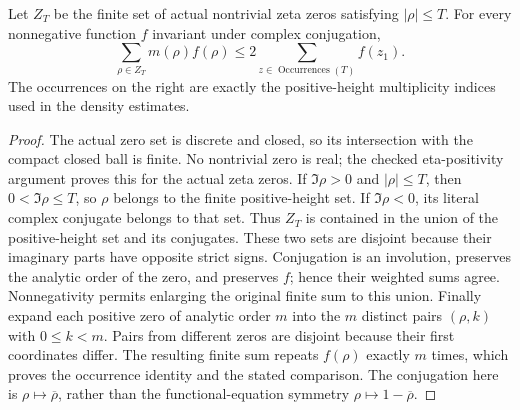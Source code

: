\begin{lemma}
\label{kernel:both-signs}
\leanok
Let $Z_T$ be the finite set of actual nontrivial zeta zeros satisfying
$|\rho|\leq T$.
For every nonnegative function $f$ invariant under complex conjugation,
\[
 \sum_{\rho\in Z_T}m(\rho)f(\rho)
 \leq2\sum_{z\in\operatorname{Occurrences}(T)}f(z_1).
\]
The occurrences on the right are exactly the positive-height
multiplicity indices used in the density estimates.
\end{lemma}
\begin{proof}
The actual zero set is discrete and closed, so its intersection with
the compact closed ball is finite.  No nontrivial zero is real; the
checked eta-positivity argument proves this for the actual zeta zeros.
If $\Im\rho>0$ and $|\rho|\leq T$, then
$0<\Im\rho\leq T$, so $\rho$ belongs to the finite positive-height
set.  If $\Im\rho<0$, its literal complex conjugate belongs to that
set.  Thus $Z_T$ is contained in the union of the positive-height set
and its conjugates.
These two sets are disjoint because their imaginary parts have opposite
strict signs.  Conjugation is an involution, preserves the analytic
order of the zero, and preserves $f$; hence their weighted sums agree.
Nonnegativity permits enlarging the original finite sum to this union.
Finally expand each positive zero of analytic order $m$ into the
$m$ distinct pairs $(\rho,k)$ with $0\leq k<m$.
Pairs from different zeros are disjoint because their first coordinates
differ.  The resulting finite sum repeats $f(\rho)$ exactly $m$ times,
which proves the occurrence identity and the stated comparison.
The conjugation here is $\rho\mapsto\overline\rho$, rather than the
functional-equation symmetry $\rho\mapsto1-\overline\rho$.
\end{proof}

